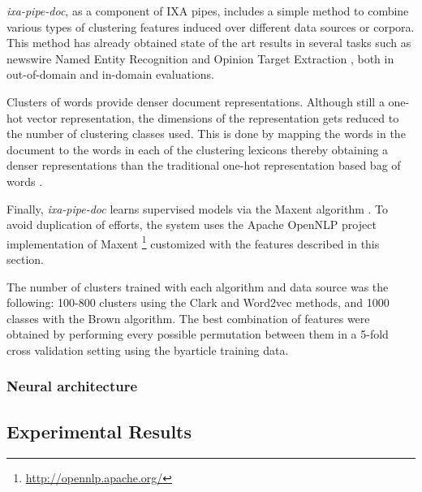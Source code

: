 \documentclass[information,article,submit,moreauthors,pdftex,10pt,a4paper]{Definitions/mdpi}
\begin{document}
\emph{ixa-pipe-doc}, as a component of IXA pipes, includes a simple method to combine various types of clustering features induced over different data sources or corpora. This method has already obtained state of the art results in several tasks such as newswire Named Entity Recognition \cite{agerri2016robust} and Opinion Target Extraction \cite{agerri2019language}, both in out-of-domain and in-domain evaluations.

Clusters of words provide denser document representations. Although still a one-hot vector representation, the dimensions of the representation gets reduced to the number of clustering classes used. This is done by mapping the words in the document to the words in each of the clustering lexicons thereby obtaining a denser representations than the traditional one-hot representation based bag of words \cite{turian-ratinov-bengio:2010:ACL}.

Finally, \emph{ixa-pipe-doc} learns supervised models via the Maxent algorithm \cite{ratnaparkhi1999learning}. To avoid duplication of efforts, the system uses the Apache OpenNLP project implementation of Maxent \footnote{\url{http://opennlp.apache.org/}} customized with the features described in this section.

The number of clusters trained with each algorithm and data source was the following: 100-800 clusters using the Clark and Word2vec methods, and 1000 classes with the Brown algorithm. The best combination of features were obtained by performing every possible permutation between them in a 5-fold cross validation setting using the byarticle training data.

\subsubsection{Neural architecture}



\subsection{Experimental Results}

\end{document}
